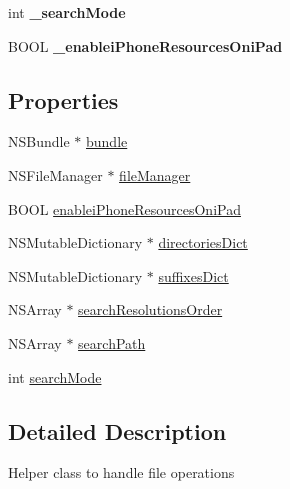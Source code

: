 \begin{DoxyCompactItemize}
\item 
\hypertarget{class_c_c_file_utils_a20801dbc83a287eee30e1e9ba5751880}{int {\bfseries \-\_\-search\-Mode}}\label{class_c_c_file_utils_a20801dbc83a287eee30e1e9ba5751880}

\item 
\hypertarget{class_c_c_file_utils_a1071402049f3d56eb7e1a4f4e60bb5d2}{B\-O\-O\-L {\bfseries \-\_\-enablei\-Phone\-Resources\-Oni\-Pad}}\label{class_c_c_file_utils_a1071402049f3d56eb7e1a4f4e60bb5d2}

\end{DoxyCompactItemize}
\subsection*{Properties}
\begin{DoxyCompactItemize}
\item 
N\-S\-Bundle $\ast$ \hyperlink{class_c_c_file_utils_ac8f770647594f09b3df11985205c5188}{bundle}
\item 
N\-S\-File\-Manager $\ast$ \hyperlink{class_c_c_file_utils_ac215683dea5e3d946585216861b90115}{file\-Manager}
\item 
B\-O\-O\-L \hyperlink{class_c_c_file_utils_a68414e5d5e79c3b51b728ce484b281ef}{enablei\-Phone\-Resources\-Oni\-Pad}
\item 
N\-S\-Mutable\-Dictionary $\ast$ \hyperlink{class_c_c_file_utils_a3b6ba8817567c33a69a87e424b431f1f}{directories\-Dict}
\item 
N\-S\-Mutable\-Dictionary $\ast$ \hyperlink{class_c_c_file_utils_ae99815d4f19714d88f920f53946b60d3}{suffixes\-Dict}
\item 
N\-S\-Array $\ast$ \hyperlink{class_c_c_file_utils_a1153dabbde359bd48c9cbe9f5f732931}{search\-Resolutions\-Order}
\item 
N\-S\-Array $\ast$ \hyperlink{class_c_c_file_utils_a91d5f3acc62be072bd703120c21ad833}{search\-Path}
\item 
int \hyperlink{class_c_c_file_utils_ab6fe1794c328a92c3fc1229df979b8fa}{search\-Mode}
\end{DoxyCompactItemize}


\subsection{Detailed Description}
Helper class to handle file operations 

